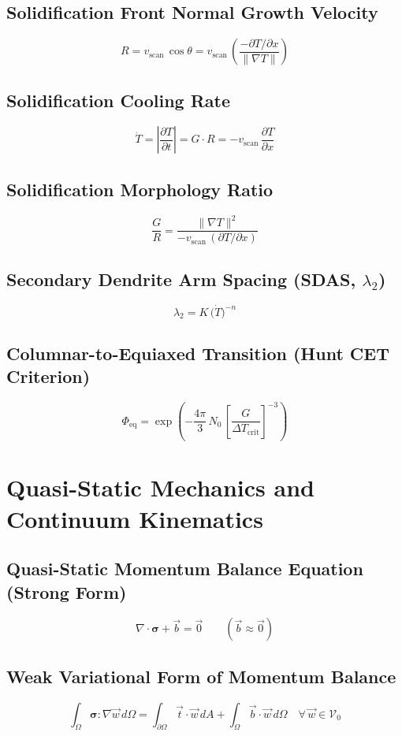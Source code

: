 \documentclass[10pt,a4paper]{article}
\begin{document}
\subsection*{Solidification Front Normal Growth Velocity}
\[
R = v_{\mathrm{scan}}\,\cos\theta = v_{\mathrm{scan}}\,\left(\frac{-\partial T / \partial x}{\|\nabla T\|}\right)
\]

\subsection*{Solidification Cooling Rate}
\[
\dot{T} = \left|\frac{\partial T}{\partial t}\right| = G \cdot R = -v_{\mathrm{scan}}\,\frac{\partial T}{\partial x}
\]

\subsection*{Solidification Morphology Ratio}
\[
\frac{G}{R} = \frac{\|\nabla T\|^2}{-v_{\mathrm{scan}}\,(\partial T / \partial x)}
\]

\subsection*{Secondary Dendrite Arm Spacing (SDAS, $\lambda_2$)}
\[
\lambda_2 = K\,\bigl(\dot{T}\bigr)^{-n}
\]

\subsection*{Columnar-to-Equiaxed Transition (Hunt CET Criterion)}
\[
\Phi_{\mathrm{eq}} = \exp\left(-\frac{4\pi}{3}\,N_0\,\left[\frac{G}{\Delta T_{\mathrm{crit}}}\right]^{-3}\right)
\]

\clearpage
\section{Quasi-Static Mechanics and Continuum Kinematics}

\subsection*{Quasi-Static Momentum Balance Equation (Strong Form)}
\[
\nabla \cdot \boldsymbol{\sigma} + \vec{b} = \vec{0} \qquad (\vec{b} \approx \vec{0})
\]

\subsection*{Weak Variational Form of Momentum Balance}
\[
\int_{\Omega} \boldsymbol{\sigma} : \nabla\vec{w}\,d\Omega = \int_{\partial\Omega} \vec{t} \cdot \vec{w}\,dA + \int_{\Omega} \vec{b} \cdot \vec{w}\,d\Omega \quad \forall\,\vec{w} \in \mathcal{V}_0
\]
\end{document}
